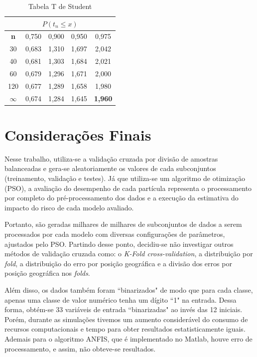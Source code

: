 \begin{table}[h]
\caption{Tabela T de Student}\label{tab:t-student} \centering
\begin{tabular}{|c|c|c|c|c|}
  \hline
  \multicolumn{5}{|c|}{$P(t_n \leq x)$}  \\
  \hline
  \textbf{n} & 0,750 & 0,900 & 0,950 & 0,975  \\
  \hline
  30 & 0,683 & 1,310 & 1,697 & 2,042   \\
  \hline
  40 & 0,681 & 1,303 & 1,684 & 2,021   \\
  \hline
  60 & 0,679 & 1,296 & 1,671 & 2,000   \\
  \hline
  120 & 0,677 & 1,289 & 1,658 & 1,980   \\
  \hline
  $\infty$ & 0,674 & 1,284 & 1,645 & \textbf{1,960}   \\
  \hline
\end{tabular}
\end{table}

\section{Considerações Finais}

Nesse trabalho, utiliza-se a validação cruzada por divisão de amostras balanceadas e gera-se aleatoriamente os valores de cada subconjuntos (treinamento, validação e testes). Já que utiliza-se um algoritmo de otimização (PSO), a avaliação do desempenho de cada partícula representa o processamento por completo do pré-processamento dos dados e a execução da estimativa do impacto do risco de cada modelo avaliado. 

Portanto, são geradas milhares de milhares de subconjuntos de dados a serem processados por cada modelo com diversas configurações de parâmetros, ajustados pelo PSO. Partindo desse ponto, decidiu-se não investigar outros métodos de validação cruzada como: o \textit{K-Fold cross-validation}, a distribuição por \textit{fold}, a distribuição do erro por posição geográfica e a divisão dos erros por posição geográfica nos \textit{folds}.

Além disso, os dados também foram ``binarizados" de modo que para cada classe, apenas uma classe de valor numérico tenha um dígito ``1" na entrada. Dessa forma, obtém-se 33 variáveis de entrada ``binarizadas" ao invés das 12 iniciais. Porém, durante as simulações tivemos um aumento considerável do consumo de recursos computacionais e tempo para obter resultados estatisticamente iguais. Ademais para o algoritmo ANFIS, que é implementado no Matlab, houve erro de processamento, e assim, não obteve-se resultados. 

\pagebreak

